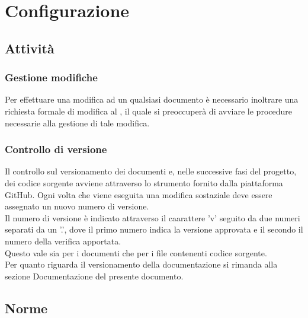 \section{Configurazione}
	\subsection{Attività}
		\subsubsection{Gestione modifiche}
		Per effettuare una modifica ad un qualsiasi documento è necessario inoltrare una richiesta formale di modifica al , il quale si preoccuperà di avviare le procedure necessarie alla gestione di tale modifica.
		\subsubsection{Controllo di versione}
		Il controllo sul versionamento dei documenti e, nelle successive fasi del progetto, dei codice sorgente avviene attraverso lo strumento fornito dalla piattaforma GitHub.
		Ogni volta che viene eseguita una modifica sostaziale deve essere assegnato un nuovo numero di versione.\\ Il numero di versione è indicato attraverso il caarattere 'v' seguito da due numeri separati da un '.', dove il primo numero indica la versione approvata e il secondo il numero della verifica apportata.\\ Questo vale sia per i documenti che per i file contenenti codice sorgente.\\
		Per quanto riguarda il versionamento della documentazione si rimanda alla sezione Documentazione del presente documento.
	\subsection{Norme}
